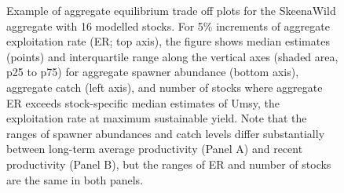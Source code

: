 \documentclass[french,11pt]{book}
\begin{document}
\clearpage


\begin{figure}[htb]

{\centering {} 

}

\caption{Example of aggregate equilibrium trade off plots for the SkeenaWild aggregate with 16 modelled stocks. For 5\% increments of aggregate exploitation rate (ER; top axis), the figure shows median estimates (points) and interquartile range along the vertical axes (shaded area, p25 to p75) for aggregate spawner abundance (bottom axis), aggregate catch (left axis), and number of stocks where aggregate ER exceeds stock-specific median estimates of Umsy, the exploitation rate at maximum sustainable yield. Note that the ranges of spawner abundances and catch levels differ substantially between long-term average productivity (Panel A) and recent productivity (Panel B), but the ranges of ER and number of stocks are the same in both panels.}\label{fig:ERBasedProfileSkeenaWild}
\end{figure}
\clearpage
\end{document}
